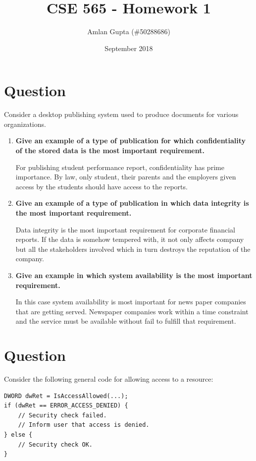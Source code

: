\documentclass{article}
\title{CSE 565 - Homework 1}
\author{Amlan Gupta (\#50288686)}
\date{September 2018}
\begin{document}
\maketitle

\section {Question}
Consider a desktop publishing system used to produce documents for various organizations.
\begin{enumerate}[label=\alph*]
\item \textbf{Give an example of a type of publication for which confidentiality of the stored data is the most important requirement.}

For publishing student performance report, confidentiality has prime importance. By law, only student, their parents and the employers given access by the students should have access to the reports.

\item \textbf{Give an example of a type of publication in which data integrity is the most important requirement.}

Data integrity is the most important requirement for corporate financial reports. If the data is somehow tempered with, it not only affects company but all the stakeholders involved which in turn destroys the reputation of the company.

\item \textbf{Give an example in which system availability is the most important requirement.}

In this case system availability is most important for news paper companies that are getting served. Newspaper companies work within a time constraint and the service must be available without fail to fulfill that requirement.

\end{enumerate}


\section {Question}

Consider the following general code for allowing access to a resource: 

\begin{verbatim}
DWORD dwRet = IsAccessAllowed(...);
if (dwRet == ERROR_ACCESS_DENIED) {
    // Security check failed.
    // Inform user that access is denied.
} else {
    // Security check OK.
}
\end{verbatim}
\end{document}
